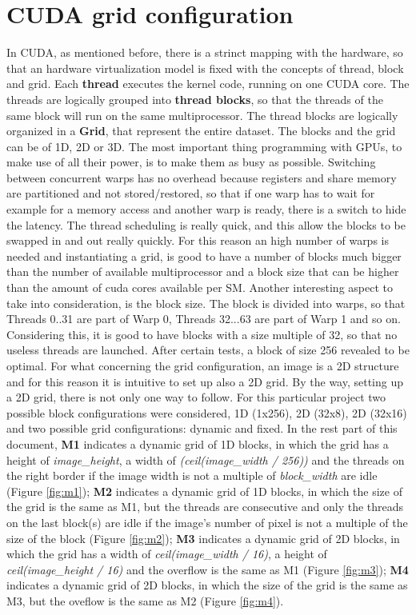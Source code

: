 \documentclass[a4paper]{article}
\begin{document}
\section{CUDA grid configuration}
\label{sec:grid}
In CUDA, as mentioned before, there is a strinct mapping with the hardware, so that an hardware virtualization model is fixed with the concepts of thread, block and grid.
Each \textbf{thread} executes the kernel code, running on one CUDA core.
The threads are logically grouped into \textbf{thread blocks}, so that the threads of the same block will run on the same multiprocessor. The thread blocks are logically organized in a \textbf{Grid}, that represent the entire dataset. The blocks and the grid can be of 1D, 2D or 3D.
The most important thing programming with GPUs, to make use of all their power, is to make them as busy as possible. Switching between concurrent warps has no overhead because registers and share memory are partitioned and not stored/restored, so that if one warp has to wait for example for a memory access and another warp is ready, there is a switch to hide the latency. The thread scheduling is really quick, and this allow the blocks to be swapped in and out really quickly. For this reason an high number of warps is needed and instantiating a grid, is good to have a number of blocks much bigger than the number of available multiprocessor and a block size that can be higher than the amount of cuda cores available per SM.
Another interesting aspect to take into consideration, is the block size. The block is divided into warps, so that Threads 0..31 are part of Warp 0, Threads 32...63 are part of Warp 1 and so on. Considering this, it is good to have blocks with a size multiple of 32, so that no useless threads are launched. After certain tests, a block of size 256 revealed to be optimal. For what concerning the grid configuration, an image is a 2D structure and for this reason it is intuitive to set up also a 2D grid. By the way, setting up a 2D grid, there is not only one way to follow. For this particular project two possible block configurations were considered, 1D (1x256), 2D (32x8), 2D (32x16) and two possible grid configurations: dynamic and fixed. In the rest part of this document, \textbf{M1} indicates a dynamic grid of 1D blocks, in which the grid has a height of \textit{image\_height}, a width of \textit{(ceil(image\_width / 256))} and the threads on the right border if the image width is not a multiple of \textit{block\_width} are idle (Figure \ref{fig:m1}); \textbf{M2} indicates a dynamic grid of 1D blocks, in which the size of the grid is the same as M1, but the threads are consecutive and only the threads on the last block(s) are idle if the image's number of pixel is not a multiple of the size of the block (Figure \ref{fig:m2}); \textbf{M3} indicates a dynamic grid of 2D blocks, in which the grid has a width of \textit{ceil(image\_width / 16)}, a height of \textit{ceil(image\_height / 16)} and the overflow is the same as M1 (Figure \ref{fig:m3}); \textbf{M4} indicates a dynamic grid of 2D blocks, in which the size of the grid is the same as M3, but the oveflow is the same as M2 (Figure \ref{fig:m4}). 
\end{document}
